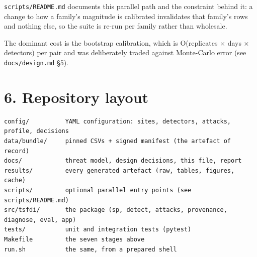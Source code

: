 \documentclass[10pt,a4paper]{article}
\begin{document}
\texttt{scripts/\allowbreak{}README.md} documents this parallel path and the constraint behind it: a change to how a family's magnitude is calibrated invalidates that family's rows and nothing else, so the suite is re-\allowbreak{}run per family rather than wholesale.

The dominant cost is the bootstrap calibration, which is O(replicates $\times$ days $\times$ detectors) per pair and was deliberately traded against Monte-\allowbreak{}Carlo error (see \texttt{docs/\allowbreak{}design.md} §5).

\section*{6. Repository layout}
\begin{Verbatim}[breaklines=true,breakanywhere=true,fontsize=\footnotesize,frame=none,numbers=none]
config/          YAML configuration: sites, detectors, attacks, profile, decisions
data/bundle/     pinned CSVs + signed manifest (the artefact of record)
docs/            threat model, design decisions, this file, report
results/         every generated artefact (raw, tables, figures, cache)
scripts/         optional parallel entry points (see scripts/README.md)
src/tsfdi/       the package (sp, detect, attacks, provenance, diagnose, eval, app)
tests/           unit and integration tests (pytest)
Makefile         the seven stages above
run.sh           the same, from a prepared shell
\end{Verbatim}
\end{document}
